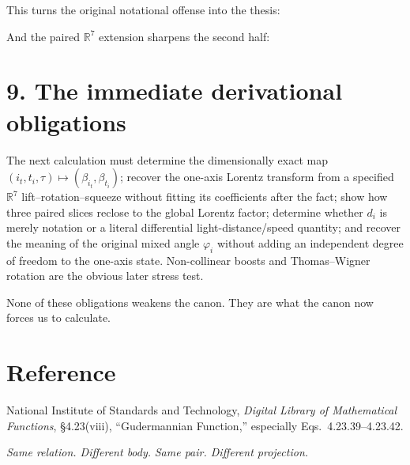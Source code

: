 \documentclass[8pt,twocolumn]{extarticle}
\newcommand{\R}{\mathbb{R}}
\begin{document}
This turns the original notational offense into the thesis:
\begin{center}
\end{center}
And the paired $\R^7$ extension sharpens the second half:
\begin{center}
\end{center}

\section*{9. The immediate derivational obligations}

The next calculation must determine the dimensionally exact map
$(i_t,t_i,\tau)\mapsto(\beta_{i_t},\beta_{t_i})$; recover the one-axis Lorentz
transform from a specified $\R^7$ lift--rotation--squeeze without fitting its
coefficients after the fact; show how three paired slices reclose to the
global Lorentz factor; determine whether $d_i$ is merely notation or a
literal differential light-distance/speed quantity; and recover the meaning
of the original mixed angle $\varphi_i$ without adding an independent degree
of freedom to the one-axis state. Non-collinear boosts and Thomas--Wigner
rotation are the obvious later stress test.

None of these obligations weakens the canon. They are what the canon now
forces us to calculate.

\section*{Reference}

\small
National Institute of Standards and Technology, \emph{Digital Library of
Mathematical Functions}, \S4.23(viii), ``Gudermannian Function,'' especially
Eqs.~4.23.39--4.23.42.

\vfill
\begin{center}
\textit{Same relation. Different body.}\qquad
\textit{Same pair. Different projection.}
\end{center}
\end{document}
